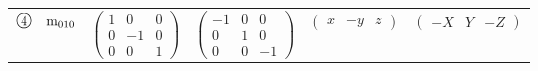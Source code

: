 \documentclass[fleqn,10pt,landscape]{jsarticle}
\begin{document}
\begin{center}
\begin{longtable}{lcccc}
$ {\ooalign{\hfil\resizebox{.8\width}{\height}{4}\hfil\crcr\raise.1ex\hbox{\large$\bigcirc$}}}\quad {\rm m}_{010} $ & $ \begin{pmatrix} 1 & 0 & 0 \\ 0 & -1 & 0 \\ 0 & 0 & 1 \end{pmatrix} $ & $ \begin{pmatrix} -1 & 0 & 0 \\ 0 & 1 & 0 \\ 0 & 0 & -1 \end{pmatrix} $ & $ \begin{pmatrix} x & - y & z \end{pmatrix} $ & $ \begin{pmatrix} - X & Y & - Z \end{pmatrix} $ \\
\end{longtable}
\end{center}
\newpage
\end{document}

